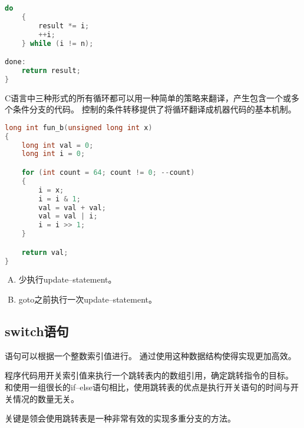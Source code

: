 {{{\begin{practicec}
\begin{lstlisting}[language=C]
    do
    {
        result *= i;
        ++i;
    } while (i != n);

done:
    return result;
}
                \end{lstlisting}
            \end{practicec}

            C语言中三种形式的所有循环都可以用一种简单的策略来翻译，产生包含一个或多个条件分支的代码。
            控制的条件转移提供了将循环翻译成机器代码的基本机制。

            \begin{practicec}
                \begin{lstlisting}[language=C]
long int fun_b(unsigned long int x)
{
    long int val = 0;
    long int i = 0;

    for (int count = 64; count != 0; --count)
    {
        i = x;
        i = i & 1;
        val = val + val;
        val = val | i;
        i = i >> 1;
    }

    return val;
}
                \end{lstlisting}
            \end{practicec}

            \begin{practicec}
                \begin{enumerate}[A.]
                    \item 少执行update--statement。
                    \item goto之前执行一次update--statement。
                \end{enumerate}
            \end{practicec}
        }
    }

    \subsection{switch语句}
    {
        语句可以根据一个整数索引值进行。
        通过使用这种数据结构使得实现更加高效。

        程序代码用开关索引值来执行一个跳转表内的数组引用，确定跳转指令的目标。
        和使用一组很长的if--else语句相比，使用跳转表的优点是执行开关语句的时间与开关情况的数量无关。

        关键是领会使用跳转表是一种非常有效的实现多重分支的方法。

}}
